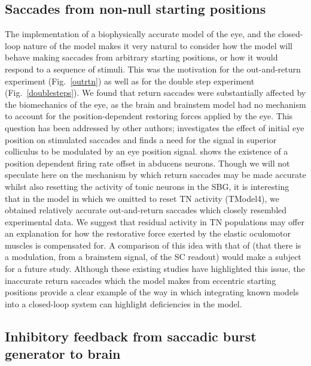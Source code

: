 \documentclass{frontiersSCNS}
\begin{document}
\subsection{Saccades from non-null starting positions}

The implementation of a biophysically accurate model of the eye, and
the closed-loop nature of the model makes it very natural to consider
how the model will behave making saccades from arbitrary starting
positions, or how it would respond to a sequence of stimuli. This was
the motivation for the out-and-return experiment (Fig.~\ref{outrtn})
as well as for the double step experiment (Fig.~\ref{doublesteps}).
We found that return saccades were substantially affected by the
biomechanics of the eye, as the brain and brainstem model had no
mechanism to account for the position-dependent restoring forces applied
by the eye. This question has been addressed by other authors;
\cite{groh_effects_2011} investigates the effect of
initial eye position on stimulated saccades
and finds a need for the signal in superior colliculus to be modulated
by an eye position signal. \cite{ling_effects_2007} shows the existence
of a position dependent firing rate offset in abducens neurons. Though
we will not speculate here on the mechanism by which return saccades
may be made accurate whilst also resetting the activity of tonic
neurons in the SBG, it is interesting that in the model in which we
omitted to reset TN activity (TModel4), we obtained relatively accurate
out-and-return saccades which closely resembled experimental data.
We suggest that residual activity in TN populations may offer an
explanation for how the restorative force exerted by
the elastic oculomotor muscles is compensated for. A comparison of
this idea with that of \cite{groh_effects_2011} (that there is a
modulation, from a brainstem signal, of the SC readout) would make
a subject for a future study. Although these existing studies have
highlighted this issue, the inaccurate return saccades which the
model makes from eccentric starting positions provide a clear example
of the way in which integrating known models into a closed-loop system
can highlight deficiencies in the model.

\subsection{Inhibitory feedback from saccadic burst generator to brain}
\end{document}
